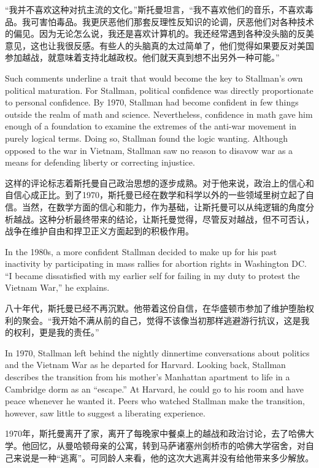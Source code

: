 \ifdefined\chs
``我并不喜欢这种对抗主流的文化。''斯托曼坦言，``我不喜欢他们的音乐，不喜欢毒品。我可害怕毒品。我更厌恶他们那套反理性反知识的论调，厌恶他们对各种技术的偏见。因为无论怎么说，我还是喜欢计算机的。我还经常遇到各种没头脑的反美意见，这也让我很反感。有些人的头脑真的太过简单了，他们觉得如果要反对美国参加越战，就意味着支持北越政权。他们就天真到想不出另外一种可能。''
\fi

\ifdefined\eng
Such comments underline a trait that would become the key to Stallman's own political maturation. For Stallman, political confidence was directly proportionate to personal confidence. By 1970, Stallman had become confident in few things outside the realm of math and science. Nevertheless, confidence in math gave him enough of a foundation to examine the extremes of the anti-war movement in purely logical terms.  Doing so, Stallman found the logic wanting. Although opposed to the war in Vietnam, Stallman saw no reason to disavow war as a means for defending liberty or correcting injustice.
\fi

\ifdefined\chs
这样的评论标志着斯托曼自己政治思想的逐步成熟。对于他来说，政治上的信心和自信心成正比。到了1970，斯托曼已经在数学和科学以外的一些领域里树立起了自信。当然，在数学方面的信心和能力，作为基础，让斯托曼可以从纯逻辑的角度分析越战。这种分析最终带来的结论，让斯托曼觉得，尽管反对越战，但不可否认，战争在维护自由和捍卫正义方面起到的积极作用。
\fi

\ifdefined\eng
In the 1980s, a more confident Stallman decided to make up for his past inactivity by participating in mass rallies for abortion rights in Washington DC.  ``I became dissatisfied with my earlier self for failing in my duty to protest the Vietnam War,'' he explains.
\fi

\ifdefined\chs
八十年代，斯托曼已经不再沉默。他带着这份自信，在华盛顿市参加了维护堕胎权利的聚会。``我开始不满从前的自己，觉得不该像当初那样逃避游行抗议，这是我的权利，更是我的责任。''
\fi

\ifdefined\eng
In 1970, Stallman left behind the nightly dinnertime conversations about politics and the Vietnam War as he departed for Harvard. Looking back, Stallman describes the transition from his mother's Manhattan apartment to life in a Cambridge dorm as an ``escape.'' At Harvard, he could go to his room and have peace whenever he wanted it. Peers who watched Stallman make the transition, however, saw little to suggest a liberating experience.
\fi

\ifdefined\chs
1970年，斯托曼离开了家，离开了每晚家中餐桌上的越战和政治讨论，去了哈佛大学。他回忆，从曼哈顿母亲的公寓，转到马萨诸塞州剑桥市的哈佛大学宿舍，对自己来说是一种``逃离''。可同龄人来看，他的这次大逃离并没有给他带来多少解放。
\fi

